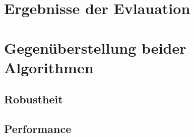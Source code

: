 \section{Ergebnisse der Evlauation}
\label{sec:anforderunsevaluierung}


\section{Gegenüberstellung beider Algorithmen}
\label{sec:gegenueberstellung}

\subsection{Robustheit}
\label{subsec:discussion_robsutness}
	

\subsection{Performance}
\label{subsec:discussion_performance}
  

